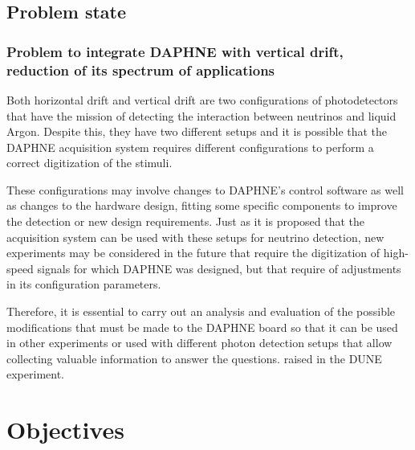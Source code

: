 \documentclass[a4paper,10pt,epsfig,epsf,amsfonts,amsmath]{article}
\begin{document}
\subsection{Problem state}

\subsubsection{Problem to integrate DAPHNE with vertical drift, reduction of its spectrum of applications}

Both horizontal drift and vertical drift are two configurations of photodetectors that have the mission of detecting the interaction between neutrinos and liquid Argon. Despite this, they have two different setups and it is possible that the DAPHNE acquisition system requires different configurations to perform a correct digitization of the stimuli.

These configurations may involve changes to DAPHNE's control software as well as changes to the hardware design, fitting some specific components to improve the detection or new design requirements. Just as it is proposed that the acquisition system can be used with these setups for neutrino detection, new experiments may be considered in the future that require the digitization of high-speed signals for which DAPHNE was designed, but that require of adjustments in its configuration parameters. 

Therefore, it is essential to carry out an analysis and evaluation of the possible modifications that must be made to the DAPHNE board so that it can be used in other experiments or used with different photon detection setups that allow collecting valuable information to answer the questions. raised in the DUNE experiment.




\section{Objectives}
\end{document}
